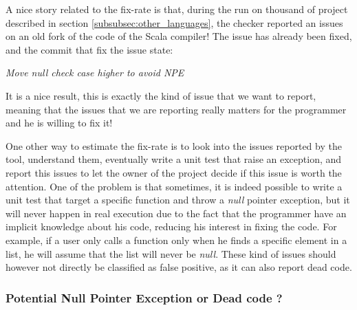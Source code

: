 A nice story related to the fix-rate is that, during the run on thousand of project described in section \ref{subsubsec:other_languages}, the checker reported an issues on an old fork of the code of the Scala compiler! The issue has already been fixed, and the commit that fix the issue state:

\begin{displayquote}
	\centering
	\textit{Move null check case higher to avoid NPE}
\end{displayquote}

It is a nice result, this is exactly the kind of issue that we want to report, meaning that the issues that we are reporting really matters for the programmer and he is willing to fix it!

One other way to estimate the fix-rate is to look into the issues reported by the tool, understand them, eventually write a unit test that raise an exception, and report this issues to let the owner of the project decide if this issue is worth the attention.
One of the problem is that sometimes, it is indeed possible to write a unit test that target a specific function and throw a \emph{null} pointer exception, but it will never happen in real execution due to the fact that the programmer have an implicit knowledge about his code, reducing his interest in fixing the code. 
For example, if a user only calls a function only when he finds a specific element in a list, he will assume that the list will never be \emph{null}. 
These kind of issues should however not directly be classified as false positive, as it can also report dead code.

\subsubsection{Potential Null Pointer Exception or Dead code ?}
\label{subsubsec:dead_code}



